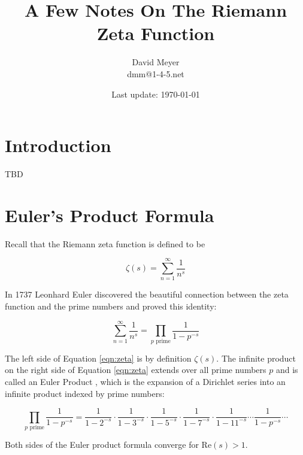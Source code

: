 \documentclass[11pt, oneside]{article}   	%
\title{A Few Notes On The Riemann Zeta Function}
\author{David Meyer \\ dmm@1-4-5.net}
\date{Last update: \today}							%
\theoremstyle{definition}
\begin{document}
\maketitle

\section{Introduction}
TBD

\section{Euler's Product Formula}
Recall that the Riemann zeta function is defined to be

\medskip
\begin{equation*}
\zeta(s) = \sum^\infty_{n = 1} \frac{1}{n^s}
\end{equation*}

\bigskip
\noindent
In 1737 Leonhard Euler \cite{euler_product_formula} discovered the beautiful connection between the zeta function and the prime numbers and proved this identity:

\medskip
\begin{equation}
\sum^\infty_{n = 1} \frac{1}{n^s} = \prod_{\text{$p$ prime}} \!  \frac{1}{1 - p^{-s}}
\label{eqn:zeta}
\end{equation}

\bigskip
\noindent
The left side of Equation \ref{eqn:zeta} is by definition $\zeta(s)$. The infinite product on the right side of Equation \ref{eqn:zeta}  extends over all prime numbers $p$ and is called an Euler 
Product \cite{euler_product}, which is the expansion of a Dirichlet series into an infinite product indexed by prime numbers:

\begin{equation*}
\prod_{\text{$p$ prime}} \!  \frac{1}{1 - p^{-s}} = \frac{1}{1 - 2^{-s}} \cdot \frac{1}{1 - 3^{-s}} \cdot  \frac{1}{1 - 5^{-s}} \cdot  \frac{1}{1 - 7^{-s}} \cdot  \frac{1}{1 - 11^{-s}} \cdots  \frac{1}{1 - p^{-s}} \cdots
\end{equation*}

\bigskip
\noindent
Both sides of the Euler product formula converge for $\text{Re}(s) > 1$.




\end{document}
